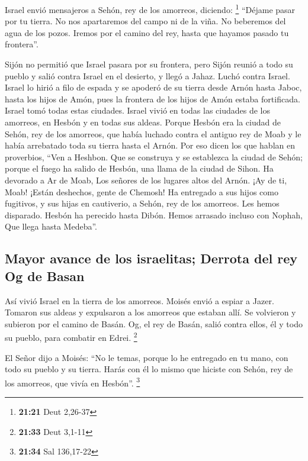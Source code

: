 \begin{paracol}{2}
 Israel envió mensajeros a Sehón, rey de los amorreos,
diciendo: \footnote{\textbf{21:21} Deut 2,26-37} 
``Déjame pasar por tu tierra. No nos apartaremos del campo ni de la
viña. No beberemos del agua de los pozos. Iremos por el camino del rey,
hasta que hayamos pasado tu frontera''.

 Sijón no permitió que Israel pasara por su frontera,
pero Sijón reunió a todo su pueblo y salió contra Israel en el desierto,
y llegó a Jahaz. Luchó contra Israel.  Israel lo hirió a
filo de espada y se apoderó de su tierra desde Arnón hasta Jaboc, hasta
los hijos de Amón, pues la frontera de los hijos de Amón estaba
fortificada.  Israel tomó todas estas ciudades. Israel
vivió en todas las ciudades de los amorreos, en Hesbón y en todas sus
aldeas.  Porque Hesbón era la ciudad de Sehón, rey de los
amorreos, que había luchado contra el antiguo rey de Moab y le había
arrebatado toda su tierra hasta el Arnón.  Por eso dicen
los que hablan en proverbios, ``Ven a Heshbon. Que se construya y se
establezca la ciudad de Sehón;  porque el fuego ha salido
de Hesbón, una llama de la ciudad de Sihon. Ha devorado a Ar de Moab,
Los señores de los lugares altos del Arnón.  ¡Ay de ti,
Moab! ¡Están deshechos, gente de Chemosh! Ha entregado a sus hijos como
fugitivos, y sus hijas en cautiverio, a Sehón, rey de los amorreos.
 Les hemos disparado. Hesbón ha perecido hasta Dibón.
Hemos arrasado incluso con Nophah, Que llega hasta Medeba''.

\hypertarget{mayor-avance-de-los-israelitas-derrota-del-rey-og-de-basan}{%
\subsection{Mayor avance de los israelitas; Derrota del rey Og de
Basan}\label{mayor-avance-de-los-israelitas-derrota-del-rey-og-de-basan}}

 Así vivió Israel en la tierra de los amorreos.
 Moisés envió a espiar a Jazer. Tomaron sus aldeas y
expulsaron a los amorreos que estaban allí.  Se volvieron
y subieron por el camino de Basán. Og, el rey de Basán, salió contra
ellos, él y todo su pueblo, para combatir en Edrei. \footnote{\textbf{21:33}
  Deut 3,1-11}

 El Señor dijo a Moisés: ``No le temas, porque lo he
entregado en tu mano, con todo su pueblo y su tierra. Harás con él lo
mismo que hiciste con Sehón, rey de los amorreos, que vivía en Hesbón''.
\footnote{\textbf{21:34} Sal 136,17-22}


\end{paracol}
